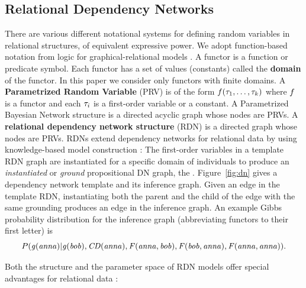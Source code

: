\documentclass[runningheads,a4paper]{llncs}
\newcommand{\fixneeded}[1]{\textbf{[\footnotesize #1]}}
\begin{document}
\subsection{Relational Dependency Networks} There are various different notational systems for defining random variables in relational structures, of equivalent expressive power. We adopt function-based notation from logic  for graphical-relational models \cite{Russell2010,Poole2003}. A functor is a function or predicate symbol. Each functor has a set of values (constants) called the \textbf{domain} of the functor. In this paper we consider only functors with finite domains. A \textbf{Parametrized Random Variable} (PRV) is of the form $f(\tau_{1},\ldots,\tau_{k})$ where $f$ is a functor 
and each $\tau_{i}$ is a first-order variable or a constant.
 A Parametrized Bayesian Network structure is a directed acyclic graph whose nodes are PRVs. A \textbf{relational dependency network structure} (RDN) is a directed graph whose nodes are PRVs.
RDNs extend dependency networks for relational data by using knowledge-based model construction \cite{Neville2007}:
%
%
 The first-order variables in a template RDN graph are instantiated for a specific domain of individuals to produce an {\em  instantiated} or {\em ground} propositional DN graph, the . Figure~\ref{fig:dn} gives a dependency network template and its  inference graph. Given an edge in the template RDN, instantiating both the parent and the child of the edge with the same grounding produces an edge in the inference graph. An example Gibbs probability distribution for the inference graph (abbreviating functors to their first letter) is
$$P(\it{g(anna)}|\it{g(bob)}, \it{CD(anna)}, \it{F(anna,bob)},\it{F(bob,anna)},\it{F(anna,anna)}).$$

\noindent Both the structure and the parameter space of RDN models offer special advantages for relational data \cite{Neville2007,Natarajan2012}: 
\end{document}
